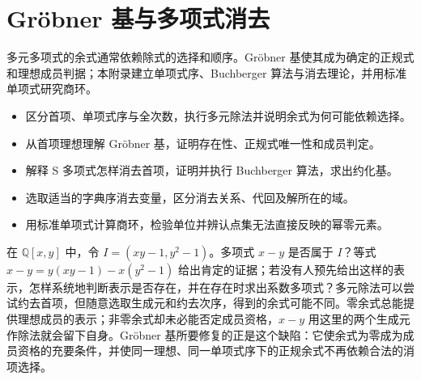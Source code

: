 


\chapter{Gröbner 基与多项式消去}
\label{b1:app:F}

\begin{chapterabstract}
	多元多项式的余式通常依赖除式的选择和顺序。Gröbner 基使其成为确定的正规式和理想成员判据；本附录建立单项式序、Buchberger 算法与消去理论，并用标准单项式研究商环。
\end{chapterabstract}

\begin{learninggoals}
	\begin{itemize}
		\item 区分首项、单项式序与全次数，执行多元除法并说明余式为何可能依赖选择。
		\item 从首项理想理解 Gröbner 基，证明存在性、正规式唯一性和成员判定。
		\item 解释 S 多项式怎样消去首项，证明并执行 Buchberger 算法，求出约化基。
		\item 选取适当的字典序消去变量，区分消去关系、代回及解所在的域。
		\item 用标准单项式计算商环，检验单位并辨认点集无法直接反映的幂零元素。
	\end{itemize}
\end{learninggoals}

在 \(\mathbb Q[x,y]\) 中，令 \(I=(xy-1,y^2-1)\)。多项式 \(x-y\) 是否属于 \(I\)？等式 \(x-y=y(xy-1)-x(y^2-1)\) 给出肯定的证据；若没有人预先给出这样的表示，怎样系统地判断表示是否存在，并在存在时求出系数多项式？多元除法可以尝试约去首项，但随意选取生成元和约去次序，得到的余式可能不同。零余式总能提供理想成员的表示；非零余式却未必能否定成员资格，\(x-y\) 用这里的两个生成元作除法就会留下自身。Gröbner 基所要修复的正是这个缺陷：它使余式为零成为成员资格的充要条件，并使同一理想、同一单项式序下的正规余式不再依赖合法的消项选择。

